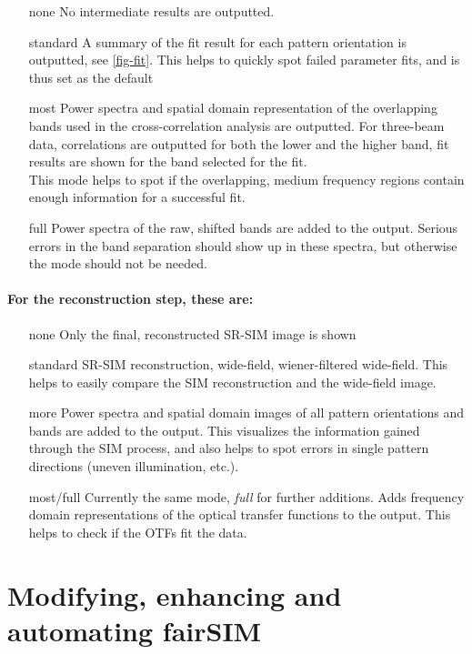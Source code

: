 \documentclass[twoside=false,
           twocolumn=false,
           a4paper,DIV=15,
           10pt]{scrartcl}
\begin{document}
\begin{itemize}
\item[none] No intermediate results are outputted.
\item[standard] A summary of the fit result
for each pattern orientation is outputted, see \cref{fig-fit}.
This helps to quickly spot failed parameter fits, and is thus
set as the default
\item[most]
Power spectra and spatial domain representation of the overlapping bands used
in the cross-correlation analysis are outputted. For three-beam data, correlations
are outputted for both the lower and the higher band, fit results are shown
for the band selected for the fit.\\
This mode helps to spot if the overlapping, medium frequency regions contain
enough information for a successful fit.
\item[full]
Power spectra of the raw, shifted bands are added to the output. Serious
errors in the band separation should show up in these spectra, but otherwise
the mode should not be needed.
\end{itemize}

\paragraph{For the reconstruction step, these are:}

\begin{itemize}
\item[none] Only the final, reconstructed SR-SIM image is shown
\item[standard] SR-SIM reconstruction, wide-field, wiener-filtered wide-field.
This helps to easily compare the SIM reconstruction and the wide-field image.
\item[more]
Power spectra and spatial domain images of all pattern orientations and bands
are added to the output. This visualizes the information gained through
the SIM process, and also helps to spot errors in single pattern 
directions (uneven illumination, etc.).
\item[most/full]
Currently the same mode, \textit{full} for further additions.
Adds frequency domain representations of the optical transfer functions
to the output. This helps to check if the OTFs fit the data.
\end{itemize}


\section{Modifying, enhancing and automating fairSIM}
\end{document}
